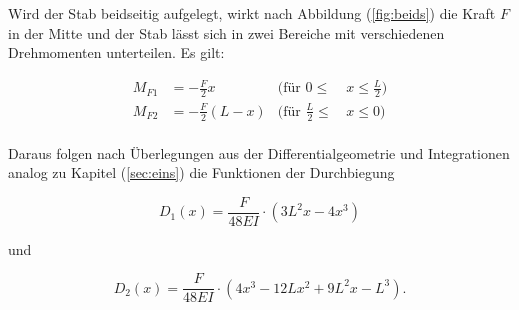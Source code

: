 \noindent
Wird der Stab beidseitig aufgelegt, wirkt nach Abbildung (\ref{fig:beids}) die Kraft $F$ in der Mitte 
und der Stab lässt sich in zwei Bereiche mit verschiedenen Drehmomenten unterteilen.
Es gilt:

\begin{align*}
    M_{F1}  &=-\frac{F}{2}x & (\text{für} \,\, 0\leq \, &x \leq \frac{L}{2}) \\
    M_{F2}  &=-\frac{F}{2}(L-x) & (\text{für}\,\, \frac{L}{2} \leq \, &x \leq 0 ) \\
\end{align*}
    
\noindent
Daraus folgen nach Überlegungen aus der Differentialgeometrie und Integrationen analog zu Kapitel (\ref{sec:eins}) die Funktionen der Durchbiegung

\begin{equation}
D_1(x) = \frac{F}{48EI}\cdot (3L^2x-4x^3)
\label{eqn:d1}
\end{equation}

\noindent
und 

\begin{equation}
    D_2(x) = \frac{F}{48EI}\cdot (4x^3-12Lx^2+9L^2x-L^3).
    \label{eqn:d2}
\end{equation}
    









